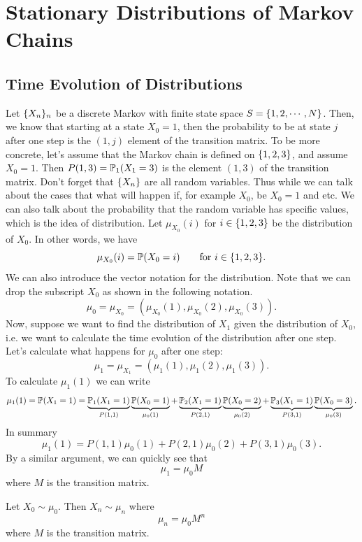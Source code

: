 \chapter{Stationary Distributions of Markov Chains}

\section{Time Evolution of Distributions}

Let $ \{X_n\}_n $ be a discrete Markov with finite state space $ S = \{1,2,\cdots,N\} $. Then, we know that starting at a state $ X_0 = 1 $, then the probability to be at state $ j $ after one step is the $ (1,j) $ element of the transition matrix. To be more concrete, let's assume that the Markov chain is defined on $ \{1,2,3\} $, and assume $ X_0 = 1 $. Then $ P(1,3)=\mathbb{P}_1(X_1=3) $ is the element $ (1,3) $ of the transition matrix. Don't forget that $ \{X_n\} $ are all random variables. Thus while we can talk about the cases that what will happen if, for example $ X_0 $, be $ X_0=1 $ and etc. We can also talk about the probability that the random variable has specific values, which is the idea of distribution. Let $ \mu_{X_0}(i) $ for $ i \in \{1,2,3\} $ be the distribution of $ X_0 $. In other words, we have
\[   \mu_{X_0}(i) = \mathbb{P}(X_0 = i) \qquad \text{for $ i \in \{1,2,3\}$}.  \]
We can also introduce the vector notation for the distribution. Note that we can drop the subscript $ X_0 $ as shown in the following notation.
\[  \mu_0=\mu_{X_0} = (\mu_{X_0}(1),\mu_{X_0}(2),\mu_{X_0}(3)). \]
Now, suppose we want to find the distribution of $X_1$ given the distribution of $X_0$, i.e. we want to calculate the time evolution of the distribution after one step. Let's calculate what happens for $  \mu_0 $ after one step:
\[  \mu_1 = \mu_{X_1} = (\mu_1(1),\mu_1(2),\mu_1(3)).  \]
To calculate $ \mu_1(1) $ we can write
\[ \mu_1(1) = \mathbb{P}(X_1 = 1) = \underbrace{\mathbb{P}_1(X_1 = 1)}_{P(1,1)}\underbrace{\mathbb{P}(X_0=1)}_{\mu_0(1)} + \underbrace{\mathbb{P}_2(X_1 = 1)}_{P(2,1)}\underbrace{\mathbb{P}(X_0=2)}_{\mu_0(2)} +  \underbrace{\mathbb{P}_3(X_1 = 1)}_{P(3,1)}\underbrace{\mathbb{P}(X_0=3)}_{\mu_0(3)}. \]
In summary
\[ \mu_1(1) = P(1,1)\mu_0(1) + P(2,1)\mu_0(2) + P(3,1)\mu_0(3). \]
By a similar argument, we can quickly see that
\[  \mu_1 = \mu_0 M  \]
where $ M $ is the transition matrix.
\begin{proposition}
	Let $ X_0 \sim \mu_0 $. Then $ X_n \sim \mu_n $ where
	\[ \mu_n = \mu_0 M^n \]
	where $ M $ is the transition matrix. 
\end{proposition}

